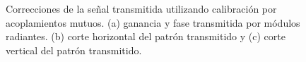 \begin{figure}[H]
	\centering

	\caption{Correcciones de la señal transmitida utilizando calibración por acoplamientos mutuos. (a) ganancia y fase 
		transmitida por módulos radiantes. (b) corte horizontal del patrón transmitido y (c) corte vertical del patrón transmitido.}
	\label{fig:nonErrMutual10degCol}
\end{figure}

